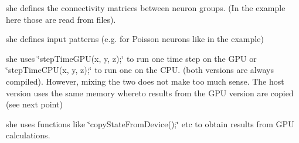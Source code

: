 \begin{DoxyItemize}
\item she defines the connectivity matrices between neuron groups. (In the example here those are read from files).
\item she defines input patterns (e.\+g. for Poisson neurons like in the example)
\item she uses \char`\"{}step\+Time\+G\+P\+U(x, y, z);\char`\"{} to run one time step on the G\+P\+U or \char`\"{}step\+Time\+C\+P\+U(x, y, z);\char`\"{} to run one on the C\+P\+U. (both versions are always compiled). However, mixing the two does not make too much sense. The host version uses the same memory whereto results from the G\+P\+U version are copied (see next point)
\item she uses functions like \char`\"{}copy\+State\+From\+Device();\char`\"{} etc to obtain results from G\+P\+U calculations. 
\end{DoxyItemize}